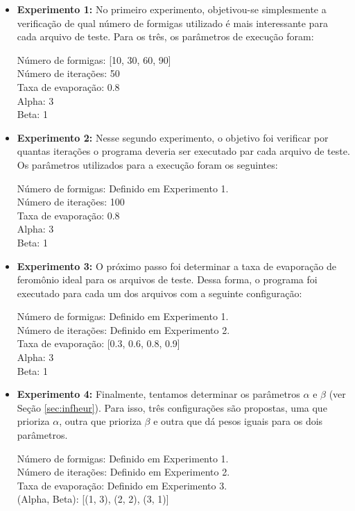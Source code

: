 \documentclass[12pt]{article}
\begin{document}
\begin{itemize}
 \item \textbf{Experimento 1:} No primeiro experimento, objetivou-se simplesmente a verificação
 de qual número de formigas utilizado é mais interessante para cada arquivo de teste. Para os
 três, os parâmetros de execução foram:
 
 Número de formigas: [10, 30, 60, 90] \\
 Número de iterações: 50 \\
 Taxa de evaporação: 0.8 \\
 Alpha: 3 \\
 Beta: 1
 
 \item \textbf{Experimento 2:} Nesse segundo experimento, o objetivo foi verificar por quantas
 iterações o programa deveria ser executado par cada arquivo de teste. Os parâmetros utilizados
 para a execução foram os seguintes:
 
 Número de formigas: Definido em Experimento 1. \\
 Número de iterações: 100 \\
 Taxa de evaporação: 0.8 \\
 Alpha: 3 \\
 Beta: 1
 
 \item \textbf{Experimento 3:} O próximo passo foi determinar a taxa de evaporação de feromônio
 ideal para os arquivos de teste. Dessa forma, o programa foi executado para cada um
 dos arquivos com a seguinte configuração:
 
 Número de formigas: Definido em Experimento 1. \\
 Número de iterações: Definido em Experimento 2. \\
 Taxa de evaporação: [0.3, 0.6, 0.8, 0.9] \\
 Alpha: 3 \\
 Beta: 1
 
 \item \textbf{Experimento 4:} Finalmente, tentamos determinar os parâmetros $\alpha$ e $\beta$
 (ver Seção \ref{sec:infheur}). Para isso, três configurações são propostas, uma que prioriza $\alpha$,
 outra que prioriza $\beta$ e outra que dá pesos iguais para os dois parâmetros.
 
 Número de formigas: Definido em Experimento 1. \\
 Número de iterações: Definido em Experimento 2. \\
 Taxa de evaporação: Definido em Experimento 3. \\
 (Alpha, Beta): [(1, 3), (2, 2), (3, 1)]
 
\end{itemize}
\end{document}
